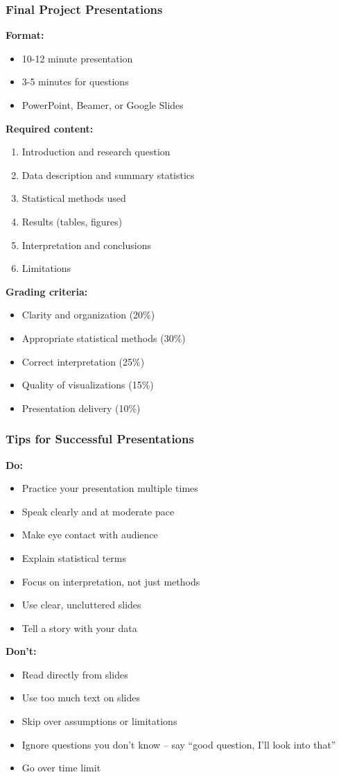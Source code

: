 \documentclass{beamer}
\begin{document}
\begin{frame}
\frametitle{Final Project Presentations}
\textbf{Format:}
\begin{itemize}
\item 10-12 minute presentation
\item 3-5 minutes for questions
\item PowerPoint, Beamer, or Google Slides
\end{itemize}

\vspace{0.3cm}
\textbf{Required content:}
\begin{enumerate}
\item Introduction and research question
\item Data description and summary statistics
\item Statistical methods used
\item Results (tables, figures)
\item Interpretation and conclusions
\item Limitations
\end{enumerate}

\vspace{0.3cm}
\textbf{Grading criteria:}
\begin{itemize}
\item Clarity and organization (20\%)
\item Appropriate statistical methods (30\%)
\item Correct interpretation (25\%)
\item Quality of visualizations (15\%)
\item Presentation delivery (10\%)
\end{itemize}
\end{frame}

\begin{frame}
\frametitle{Tips for Successful Presentations}
\textbf{Do:}
\begin{itemize}
\item Practice your presentation multiple times
\item Speak clearly and at moderate pace
\item Make eye contact with audience
\item Explain statistical terms
\item Focus on interpretation, not just methods
\item Use clear, uncluttered slides
\item Tell a story with your data
\end{itemize}

\vspace{0.3cm}
\textbf{Don't:}
\begin{itemize}
\item Read directly from slides
\item Use too much text on slides
\item Skip over assumptions or limitations
\item Ignore questions you don't know -- say ``good question, I'll look into that''
\item Go over time limit
\end{itemize}
\end{frame}
\end{document}
